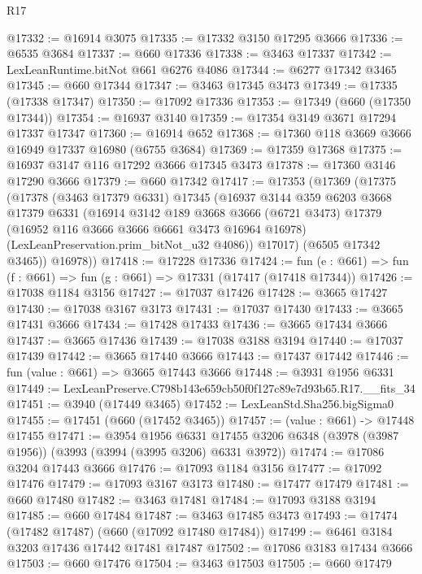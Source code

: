 \begin{lexlean}{R17}
\begin{coremodule}
@17332 := @16914 @3075
@17335 := @17332 @3150 @17295 @3666
@17336 := @6535 @3684
@17337 := @660 @17336
@17338 := @3463 @17337
@17342 := LexLeanRuntime.bitNot @661 @6276 @4086
@17344 := @6277 @17342 @3465
@17345 := @660 @17344
@17347 := @3463 @17345 @3473
@17349 := @17335 (@17338 @17347)
@17350 := @17092 @17336
@17353 := @17349 (@660 (@17350 @17344))
@17354 := @16937 @3140
@17359 := @17354 @3149 @3671 @17294 @17337 @17347
@17360 := @16914 @652
@17368 := @17360 @118 @3669 @3666 @16949 @17337 @16980 (@6755 @3684)
@17369 := @17359 @17368
@17375 := @16937 @3147 @116 @17292 @3666 @17345 @3473
@17378 := @17360 @3146 @17290 @3666
@17379 := @660 @17342
@17417 := @17353
    (@17369
      (@17375
        (@17378
          (@3463 @17379 @6331)
          @17345
          (@16937
            @3144
            @359
            @6203
            @3668
            @17379
            @6331
            (@16914
              @3142
              @189
              @3668
              @3666
              (@6721 @3473)
              @17379
              (@16952 @116 @3666 @3666 @6661 @3473 @16964 @16978)
              (LexLeanPreservation.prim_bitNot_u32 @4086))
            @17017)
          (@6505 @17342 @3465))
        @16978))
@17418 := @17228 @17336
@17424 := fun (e : @661) => fun (f : @661) => fun (g : @661) => @17331 (@17417 (@17418 @17344))
@17426 := @17038 @1184 @3156
@17427 := @17037 @17426
@17428 := @3665 @17427
@17430 := @17038 @3167 @3173
@17431 := @17037 @17430
@17433 := @3665 @17431 @3666
@17434 := @17428 @17433
@17436 := @3665 @17434 @3666
@17437 := @3665 @17436
@17439 := @17038 @3188 @3194
@17440 := @17037 @17439
@17442 := @3665 @17440 @3666
@17443 := @17437 @17442
@17446 := fun (value : @661) => @3665 @17443 @3666
@17448 := @3931 @1956 @6331
@17449 := LexLeanPreserve.C798b143e659cb50f0f127c89e7d93b65.R17.__fits_34
@17451 := @3940 (@17449 @3465)
@17452 := LexLeanStd.Sha256.bigSigma0
@17455 := @17451 (@660 (@17452 @3465))
@17457 := (value : @661) -> @17448 @17455
@17471 := @3954
    @1956
    @6331
    @17455
    @3206
    @6348
    (@3978 (@3987 @1956))
    (@3993 (@3994 (@3995 @3206) @6331 @3972))
@17474 := @17086 @3204 @17443 @3666
@17476 := @17093 @1184 @3156
@17477 := @17092 @17476
@17479 := @17093 @3167 @3173
@17480 := @17477 @17479
@17481 := @660 @17480
@17482 := @3463 @17481
@17484 := @17093 @3188 @3194
@17485 := @660 @17484
@17487 := @3463 @17485 @3473
@17493 := @17474 (@17482 @17487) (@660 (@17092 @17480 @17484))
@17499 := @6461 @3184 @3203 @17436 @17442 @17481 @17487
@17502 := @17086 @3183 @17434 @3666
@17503 := @660 @17476
@17504 := @3463 @17503
@17505 := @660 @17479

\end{coremodule}
\end{lexlean}
